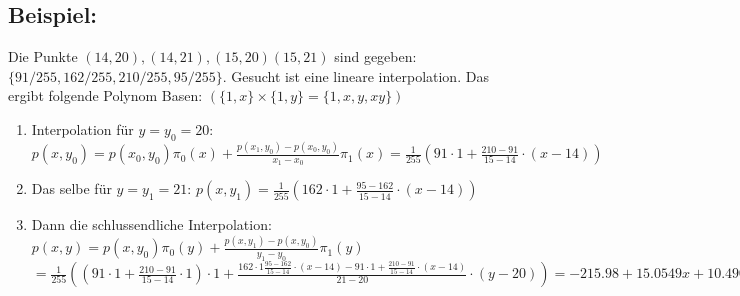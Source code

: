 \subsection{Beispiel:}
Die Punkte $(14,20),(14,21),(15,20)(15,21)$ sind gegeben: $\{91/255, 162/255, 210/255, 95/255\}$. Gesucht ist eine lineare interpolation. 
Das ergibt folgende Polynom Basen: $(\{1,x\}\times\{1,y\}=\{1,x,y,xy\})$\\
\begin{enumerate}
  \item Interpolation für $y=y_0=20$: $p(x,y_0)= p(x_0,y_0) \pi_0(x) + \frac{p(x_1,y_0)-p(x_0,y_0)}{x_1-x_0}\pi_1(x)=\frac{1}{255}\left(91 \cdot 1 + \frac{210-91}{15-14}\cdot(x-14)\right)$
  \item Das selbe für $y=y_1=21$:  $p(x,y_1)=\frac{1}{255}\left(162 \cdot 1 + \frac{95-162}{15-14}\cdot(x-14)\right)$
  \item Dann die schlussendliche Interpolation: $p(x,y)=p(x,y_0)\pi_0(y)+\frac{p(x,y_1)-p(x,y_0)}{y_1-y_0}\pi_1(y)$\\
  $=\frac 1{255} \left((91\cdot 1 +\frac{210-91}{15-14}\cdot 1)\cdot 1 + \frac{162\cdot 1 \frac{95-162}{15-14}\cdot (x-14)-91\cdot 1 + \frac{210-91}{15-14}\cdot(x-14)}{21-20}\cdot(y-20)\right)
  =-215.98 + 15.0549 x + 10.4902 y - 0.7294 x y$
\end{enumerate}

